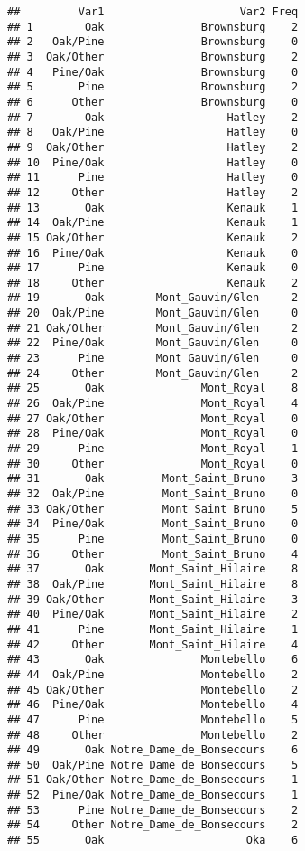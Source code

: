 \documentclass[
]{article}
\begin{document}
\begin{verbatim}
##         Var1                     Var2 Freq
## 1        Oak               Brownsburg    2
## 2   Oak/Pine               Brownsburg    0
## 3  Oak/Other               Brownsburg    2
## 4   Pine/Oak               Brownsburg    0
## 5       Pine               Brownsburg    2
## 6      Other               Brownsburg    0
## 7        Oak                   Hatley    2
## 8   Oak/Pine                   Hatley    0
## 9  Oak/Other                   Hatley    2
## 10  Pine/Oak                   Hatley    0
## 11      Pine                   Hatley    0
## 12     Other                   Hatley    2
## 13       Oak                   Kenauk    1
## 14  Oak/Pine                   Kenauk    1
## 15 Oak/Other                   Kenauk    2
## 16  Pine/Oak                   Kenauk    0
## 17      Pine                   Kenauk    0
## 18     Other                   Kenauk    2
## 19       Oak        Mont_Gauvin/Glen     2
## 20  Oak/Pine        Mont_Gauvin/Glen     0
## 21 Oak/Other        Mont_Gauvin/Glen     2
## 22  Pine/Oak        Mont_Gauvin/Glen     0
## 23      Pine        Mont_Gauvin/Glen     0
## 24     Other        Mont_Gauvin/Glen     2
## 25       Oak               Mont_Royal    8
## 26  Oak/Pine               Mont_Royal    4
## 27 Oak/Other               Mont_Royal    0
## 28  Pine/Oak               Mont_Royal    0
## 29      Pine               Mont_Royal    1
## 30     Other               Mont_Royal    0
## 31       Oak         Mont_Saint_Bruno    3
## 32  Oak/Pine         Mont_Saint_Bruno    0
## 33 Oak/Other         Mont_Saint_Bruno    5
## 34  Pine/Oak         Mont_Saint_Bruno    0
## 35      Pine         Mont_Saint_Bruno    0
## 36     Other         Mont_Saint_Bruno    4
## 37       Oak       Mont_Saint_Hilaire    8
## 38  Oak/Pine       Mont_Saint_Hilaire    8
## 39 Oak/Other       Mont_Saint_Hilaire    3
## 40  Pine/Oak       Mont_Saint_Hilaire    2
## 41      Pine       Mont_Saint_Hilaire    1
## 42     Other       Mont_Saint_Hilaire    4
## 43       Oak               Montebello    6
## 44  Oak/Pine               Montebello    2
## 45 Oak/Other               Montebello    2
## 46  Pine/Oak               Montebello    4
## 47      Pine               Montebello    5
## 48     Other               Montebello    2
## 49       Oak Notre_Dame_de_Bonsecours    6
## 50  Oak/Pine Notre_Dame_de_Bonsecours    5
## 51 Oak/Other Notre_Dame_de_Bonsecours    1
## 52  Pine/Oak Notre_Dame_de_Bonsecours    1
## 53      Pine Notre_Dame_de_Bonsecours    2
## 54     Other Notre_Dame_de_Bonsecours    2
## 55       Oak                      Oka    6

\end{verbatim}
\end{document}
